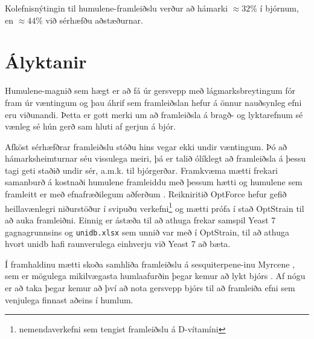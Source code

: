 \documentclass[11pt]{article}
\begin{document}
\begin{multicols}{2}
Kolefnisnýtingin til humulene-framleiðslu verður að hámarki $\approx32\%$ í bjórnum, en $\approx44\%$ við sérhæfðu aðstæðurnar.

\section{Ályktanir}

Humulene-magnið sem hægt er að fá úr gersvepp með lágmarksbreytingum fór fram úr væntingum og þau áhrif sem framleiðslan hefur á önnur nauðsynleg efni eru viðunandi. Þetta er gott merki um að framleiðsla á bragð- og lyktarefnum sé vænleg sé hún gerð sam hluti af gerjun á bjór.

Afköst sérhæfðrar framleiðslu stóðu hins vegar ekki undir væntingum. Þó að hámarksheimturnar séu vissulega meiri, þá er talið ólíklegt að framleiðsla á þessu tagi geti staðið undir sér, a.m.k. til bjórgerðar. Framkvæma mætti frekari samanburð á kostnaði humulene framleiddu með þessum hætti og humulene sem framleitt er með efnafræðilegum aðferðum \cite{corey1967total,mcmurry1982stereospecific}. Reikniritið OptForce \cite{ranganathan2010optforce} hefur gefið heillavænlegri niðurstöður í svipuðu verkefni\footnote{nemendaverkefni sem tengist framleiðslu á D-vítamíni} og mætti prófa í stað OptStrain til að auka framleiðni. Einnig er ástæða til að athuga frekar samspil Yeast 7 gagnagrunnsins og \texttt{unidb.xlsx} sem unnið var með í OptStrain, til að athuga hvort unidb hafi raunverulega einhverju við Yeast 7 að bæta.

Í framhaldinu mætti skoða samhliða framleiðslu á sesquiterpene-inu Myrcene \cite[KEGG: C06074]{Kanehisa01012000}, sem er mögulega mikilvægasta humlaafurðin þegar kemur að lykt bjórs \cite{guadagni1966odour}. Af nógu er að taka þegar kemur að því að nota gersvepp bjórs til að framleiða efni sem venjulega finnast aðeins í humlum.




\end{multicols}
\end{document}

